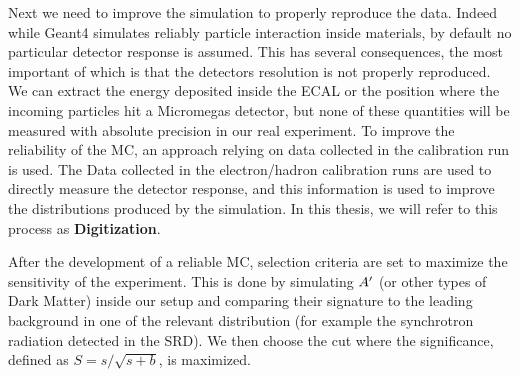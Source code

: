 Next we need to improve the simulation to properly reproduce the data. Indeed while Geant4 simulates reliably particle interaction inside materials, by default no particular detector response is assumed. This has several consequences, the most important of which is that the detectors resolution is not properly reproduced. We can extract the energy deposited inside the ECAL or the position where the incoming particles hit a Micromegas detector, but none of these quantities will be measured with absolute precision in our real experiment. To improve the reliability of the MC, an approach relying on data collected in the calibration run is used. The Data collected in the electron/hadron calibration runs are used to directly measure the detector response, and this information is used to improve the distributions produced by the simulation. In this thesis, we will refer to this process as \textbf{Digitization}.

After the development of a reliable MC, selection criteria are set to maximize the sensitivity of the experiment. This is done by simulating $A'$ (or other types of Dark Matter) inside our setup and comparing their signature to the leading background in one of the relevant distribution (for example the synchrotron radiation detected in the SRD). We then choose the cut where the significance, defined as $S = s/\sqrt{s+b}$, is maximized.

